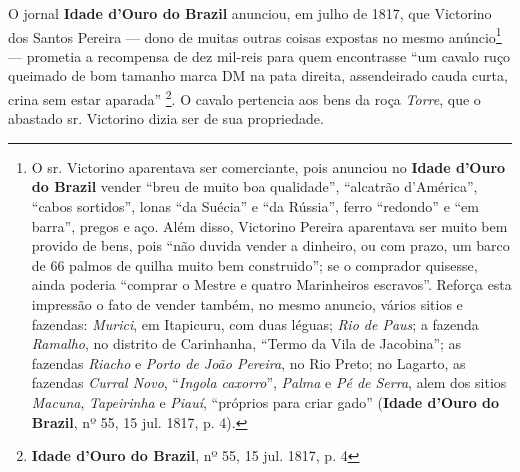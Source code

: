 O jornal \textbf{Idade d'Ouro do Brazil} anunciou, em julho de 1817, que Victorino dos Santos Pereira --- dono de muitas outras coisas expostas no mesmo anúncio\footnote{O sr. Victorino aparentava ser comerciante, pois anunciou no \textbf{Idade d'Ouro do Brazil} vender ``breu de muito boa qualidade'', ``alcatrão d'América'', ``cabos sortidos'', lonas ``da Suécia'' e ``da Rússia'', ferro ``redondo'' e ``em barra'', pregos e aço. Além disso, Victorino Pereira aparentava ser muito bem provido de bens, pois ``não duvida vender a dinheiro, ou com prazo, um barco de 66 palmos de quilha muito bem construido''; se o comprador quisesse, ainda poderia ``comprar o Mestre e quatro Marinheiros escravos''. Reforça esta impressão o fato de vender também, no mesmo anuncio, vários sitios e fazendas: \textit{Murici}, em Itapicuru, com duas léguas; \textit{Rio de Paus}; a fazenda \textit{Ramalho}, no distrito de Carinhanha, ``Termo da Vila de Jacobina''; as fazendas \textit{Riacho} e \textit{Porto de João Pereira}, no Rio Preto; no Lagarto, as fazendas \textit{Curral Novo}, ``\textit{Ingola caxorro}'', \textit{Palma} e \textit{Pé de Serra}, alem dos sitios \textit{Macuna}, \textit{Tapeirinha} e \textit{Piauí}, ``próprios para criar gado'' (\textbf{Idade d'Ouro do Brazil}, nº 55, 15 jul. 1817, p. 4).} --- prometia a recompensa de dez mil-reis para quem encontrasse ``um cavalo ruço queimado de bom tamanho marca DM na pata direita, assendeirado cauda curta, crina sem estar aparada'' \footnote{\textbf{Idade d'Ouro do Brazil}, nº 55, 15 jul. 1817, p. 4}. O cavalo pertencia aos bens da roça \textit{Torre}, que o abastado sr. Victorino dizia ser de sua propriedade.


